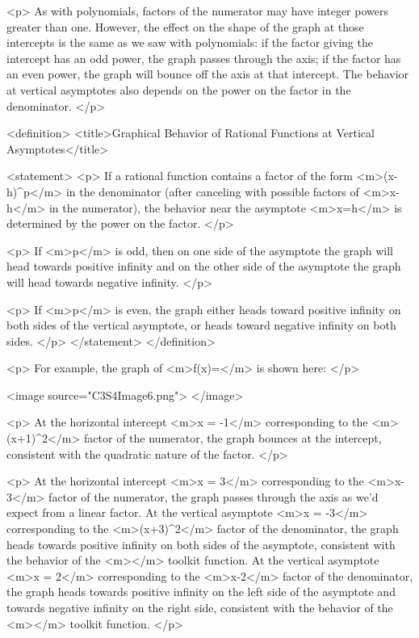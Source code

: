         <p>
            As with polynomials, factors of the numerator may have integer powers greater than one.
            However, the effect on the shape of the graph at those intercepts is the same as we saw with polynomials: if the factor giving the intercept has an odd power, the graph passes through the axis; if the factor has an even power, the graph will bounce off the axis at that intercept.
            The behavior at vertical asymptotes also depends on the power on the factor in the denominator.
        </p>

        <definition>
            <title>Graphical Behavior of Rational Functions at Vertical Asymptotes</title>

            <statement>
                <p>
                    If a rational function contains a factor of the form <m>(x-h)^{p}</m> in the denominator (after canceling with possible factors of <m>x-h</m> in the numerator), the behavior near the asymptote <m>x=h</m> is determined by the power on the factor.
                </p>

                <p>
                    If <m>p</m> is odd, then on one side of the asymptote the graph will head towards positive infinity and on the other side of the asymptote the graph will head towards negative infinity.
                </p>

                <p>
                    If <m>p</m> is even, the graph either heads toward positive infinity on both sides of the vertical asymptote, or heads toward negative infinity on both sides.
                </p>
            </statement>
        </definition>

        <p>
            For example, the graph of <m>f(x)=</m> is shown here:
        </p>

        <image source="C3S4Image6.png">
        </image>

        <p>
            At the horizontal intercept <m>x = -1</m> corresponding to the <m>(x+1)^{2}</m> factor of the numerator, the graph bounces at the intercept, consistent with the quadratic nature of the factor.
        </p>

        <p>
            At the horizontal intercept <m>x = 3</m> corresponding to the <m>x-3</m> factor of the numerator, the graph passes through the axis as we’d expect from a linear factor.
            At the vertical asymptote <m>x = -3</m> corresponding to the <m>(x+3)^{2}</m> factor of the denominator, the graph heads towards positive infinity on both sides of the asymptote, consistent with the behavior of the <m></m> toolkit function.
            At the vertical asymptote <m>x = 2</m> corresponding to the <m>x-2</m> factor of the denominator, the graph heads towards positive infinity on the left side of the asymptote and towards negative infinity on the right side, consistent with the behavior of the <m></m> toolkit function.
        </p>

